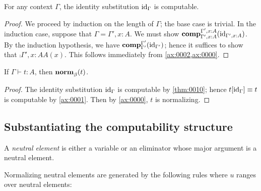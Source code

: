 \documentclass[a4paper]{article}
\begin{document}
\begin{lemma}\label{thm:0010}
  For any context $\Gamma$, the identity substitution $\mathrm{id}_{\Gamma}$ is computable.
\end{lemma}
\begin{proof}
  We proceed by induction on the length of $\Gamma$; the base case is trivial.
  In the induction case, suppose that $\Gamma = \Gamma',x : A$.
  We must show $\operatorname{\mathbf{comp}}^{\Gamma',x : A}_{\Gamma',x : A}(\mathrm{id}_{\Gamma',x : A})$.
  By the induction hypothesis, we have $\operatorname{\mathbf{comp}}^{\Gamma'}_{\Gamma'}(\mathrm{id}_{\Gamma'})$; hence it suffices to show that $\comp{\Gamma',x : A}{A}(x)$.
  This follows immediately from \cref{ax:0002,ax:0000}.
\end{proof}

\begin{theorem}[Normalization]\label{thm:0000}
  If $\Gamma \vdash t : A$, then $\operatorname{\mathbf{norm}}^{}_{\beta}(t)$.
\end{theorem}
\begin{proof}
  The identity substitution $\mathrm{id}_{\Gamma}$ is computable by \cref{thm:0010}; hence $t[\mathrm{id}_{\Gamma}] \equiv t$ is computable by \cref{ax:0001}.
  Then by \cref{ax:0000}, $t$ is normalizing.
\end{proof}

\subsection{Substantiating the computability structure}
\label{sec:0008}

\begin{definition}
  A \emph{neutral element} is either a variable or an eliminator whose major argument is a neutral element.
\end{definition}

\begin{construction}
  Normalizing neutral elements are generated by the following rules where $u$ ranges over neutral elements:
\end{construction}
\end{document}
